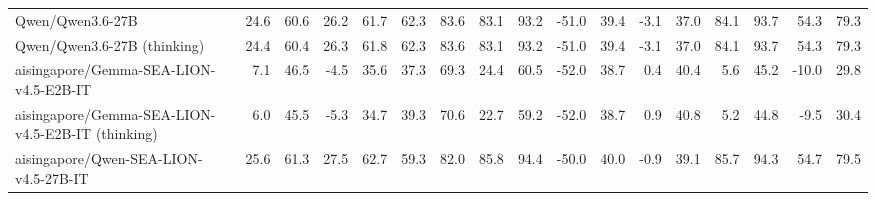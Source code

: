 \documentclass{article}
\begin{document}
\begin{table}[htbp]
\begin{threeparttable}
\begin{adjustbox}{max width=\textwidth}
\begin{tabular}{lrrrrrrrrrrrrrrrr}
Qwen/Qwen3.6-27B & \cellcolor[HTML]{C2DEEC}24.6 & \cellcolor[HTML]{BCDBEA}60.6 & \cellcolor[HTML]{C1DEEC}26.2 & \cellcolor[HTML]{B9D9E9}61.7 & \cellcolor[HTML]{B0D5E7}62.3 & \cellcolor[HTML]{AAD2E5}83.6 & \cellcolor[HTML]{A3CEE3}83.1 & \cellcolor[HTML]{9FCCE2}93.2 & \cellcolor[HTML]{F7C5AE}-51.0 & \cellcolor[HTML]{F8C8B2}39.4 & \cellcolor[HTML]{FBE2D7}-3.1 & \cellcolor[HTML]{FBE4DA}37.0 & \cellcolor[HTML]{9ECBE1}84.1 & \cellcolor[HTML]{9AC9E0}93.7 & \cellcolor[HTML]{CDE4F0}54.3 & \cellcolor[HTML]{BBDBEA}79.3 \\
Qwen/Qwen3.6-27B (thinking) & \cellcolor[HTML]{C4DFED}24.4 & \cellcolor[HTML]{BEDCEB}60.4 & \cellcolor[HTML]{C0DDEC}26.3 & \cellcolor[HTML]{B8D9E9}61.8 & \cellcolor[HTML]{B0D5E7}62.3 & \cellcolor[HTML]{AAD2E5}83.6 & \cellcolor[HTML]{A3CEE3}83.1 & \cellcolor[HTML]{9FCCE2}93.2 & \cellcolor[HTML]{F7C5AE}-51.0 & \cellcolor[HTML]{F8C8B2}39.4 & \cellcolor[HTML]{FBE2D7}-3.1 & \cellcolor[HTML]{FBE4DA}37.0 & \cellcolor[HTML]{9ECBE1}84.1 & \cellcolor[HTML]{9AC9E0}93.7 & \cellcolor[HTML]{CDE4F0}54.3 & \cellcolor[HTML]{BBDBEA}79.3 \\
aisingapore/Gemma-SEA-LION-v4.5-E2B-IT & \cellcolor[HTML]{F8CCB8}7.1 & \cellcolor[HTML]{F9D1C0}46.5 & \cellcolor[HTML]{F5B294}-4.5 & \cellcolor[HTML]{F6B598}35.6 & \cellcolor[HTML]{FCECE4}37.3 & \cellcolor[HTML]{FEF7F4}69.3 & \cellcolor[HTML]{F4A988}24.4 & \cellcolor[HTML]{F4AB8B}60.5 & \cellcolor[HTML]{F7BEA5}-52.0 & \cellcolor[HTML]{F7C1A9}38.7 & \cellcolor[HTML]{B4D7E8}0.4 & \cellcolor[HTML]{B2D6E7}40.4 & \cellcolor[HTML]{F6B79B}5.6 & \cellcolor[HTML]{F7C0A8}45.2 & \cellcolor[HTML]{F4AA89}-10.0 & \cellcolor[HTML]{F4AD8D}29.8 \\
aisingapore/Gemma-SEA-LION-v4.5-E2B-IT (thinking) & \cellcolor[HTML]{F8C5AF}6.0 & \cellcolor[HTML]{F8CAB6}45.5 & \cellcolor[HTML]{F5AE8F}-5.3 & \cellcolor[HTML]{F5B192}34.7 & \cellcolor[HTML]{FDF2EE}39.3 & \cellcolor[HTML]{FEFEFE}70.6 & \cellcolor[HTML]{F4A582}22.7 & \cellcolor[HTML]{F4A582}59.2 & \cellcolor[HTML]{F7BEA5}-52.0 & \cellcolor[HTML]{F7C1A9}38.7 & \cellcolor[HTML]{A6CFE4}0.9 & \cellcolor[HTML]{A5CFE3}40.8 & \cellcolor[HTML]{F6B69A}5.2 & \cellcolor[HTML]{F7BFA6}44.8 & \cellcolor[HTML]{F4AB8A}-9.5 & \cellcolor[HTML]{F5AE8F}30.4 \\
aisingapore/Qwen-SEA-LION-v4.5-27B-IT & \cellcolor[HTML]{BBDBEA}25.6 & \cellcolor[HTML]{B6D8E8}61.3 & \cellcolor[HTML]{BBDAEA}27.5 & \cellcolor[HTML]{B3D6E8}62.7 & \cellcolor[HTML]{BDDBEB}59.3 & \cellcolor[HTML]{B4D7E8}82.0 & \cellcolor[HTML]{9AC9E0}85.8 & \cellcolor[HTML]{98C8E0}94.4 & \cellcolor[HTML]{F8CBB7}-50.0 & \cellcolor[HTML]{F9CEBC}40.0 & \cellcolor[HTML]{DCECF4}-0.9 & \cellcolor[HTML]{DAEBF4}39.1 & \cellcolor[HTML]{9BC9E0}85.7 & \cellcolor[HTML]{97C8DF}94.3 & \cellcolor[HTML]{CCE4EF}54.7 & \cellcolor[HTML]{BADAEA}79.5 \\

\end{tabular}
\end{adjustbox}
\end{threeparttable}
\end{table}
\end{document}
